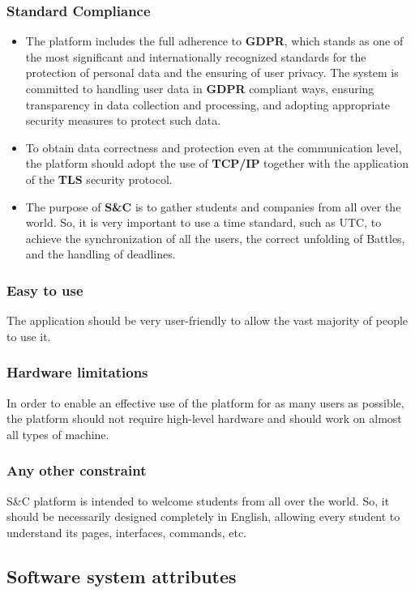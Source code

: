 \subsubsection{Standard Compliance}
\begin{itemize}
    \item The platform includes the full adherence to \textbf{GDPR}, which stands as one of the most significant and internationally recognized standards for the protection of personal data and the ensuring of user privacy. The system is committed to handling user data in \textbf{GDPR} compliant ways, ensuring transparency in data collection and processing, and adopting appropriate security measures to protect such data. 
    \item To obtain data correctness and protection even at the communication level, the platform should adopt the use of \textbf{TCP/IP} together with the application of the \textbf{TLS} security protocol. 
    \item The purpose of \textbf{S\&C} is to gather students and companies from all over the world. So, it is very important to use a time standard, such as UTC, to achieve the synchronization of all the users, the correct unfolding of Battles, and the handling of deadlines.
\end{itemize}

\subsubsection{Easy to use}
The application should be very user-friendly to allow the vast majority of people to use it.

\subsubsection{Hardware limitations}
In order to enable an effective use of the platform for as many users as possible, the platform should not require high-level hardware and should work on almost all types of machine. 

\subsubsection{Any other constraint}
S\&C platform is intended to welcome students from all over the world. So, it should be necessarily designed completely in English, allowing every student to understand its pages, interfaces, commands, etc. 

\subsection{Software system attributes}
